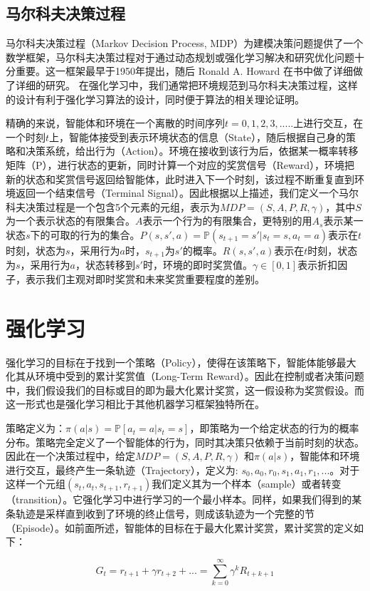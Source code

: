 \documentclass{standalone}
\begin{document}
\subsection{马尔科夫决策过程}
马尔科夫决策过程（Markov Decision Process, MDP）为建模决策问题提供了一个数学框架，马尔科夫决策过程对于通过动态规划或强化学习解决和研究优化问题十分重要。这一框架最早于1950年提出，随后 Ronald A. Howard 在书中做了详细做了详细的研究。
在强化学习中，我们通常把环境规范到马尔科夫决策过程，这样的设计有利于强化学习算法的设计，同时便于算法的相关理论证明。\par
精确的来说，智能体和环境在一个离散的时间序列$t=0,1,2,3,... ..$上进行交互，在一个时刻$t$上，智能体接受到表示环境状态的信息（State），随后根据自己身的策略和决策系统，给出行为（Action）。环境在接收到该行为后，依据某一概率转移矩阵（P），进行状态的更新，同时计算一个对应的奖赏信号（Reward），环境把新的状态和奖赏信号返回给智能体，此时进入下一个时刻，该过程不断重复直到环境返回一个结束信号（Terminal Signal）。因此根据以上描述，我们定义一个马尔科夫决策过程是一个包含5个元素的元组，表示为$MDP=(S, A, P, R, \gamma)$，其中$S$为一个表示状态的有限集合。$A$表示一个行为的有限集合，更特别的用$A_s$表示某一状态$s$下的可取的行为的集合。$P(s, s',a) = \mathbb{P}(s_{t+1} = s'|s_t = s, a_t=a)$表示在$t$时刻，状态为$s$，采用行为$a$时，$s_{t+1}$为$s'$的概率。$R(s, s', a)$表示在$t$时刻，状态为$s$，采用行为$a$，状态转移到$s'$时，环境的即时奖赏值。$\gamma \in [0, 1]$表示折扣因子，表示我们主观对即时奖赏和未来奖赏重要程度的差别。\par 

\section{强化学习}
强化学习的目标在于找到一个策略（Policy），使得在该策略下，智能体能够最大化其从环境中受到的累计奖赏值（Long-Term Reward）。因此在控制或者决策问题中，我们假设我们的目标或目的即为最大化累计奖赏，这一假设称为奖赏假设。而这一形式也是强化学习相比于其他机器学习框架独特所在。\par
策略定义为：$\pi(a|s) = \mathbb{P}[a_t=a | s_t=s]$，即策略为一个给定状态的行为的概率分布。策略完全定义了一个智能体的行为，同时其决策只依赖于当前时刻的状态。
因此在一个决策过程中，给定$MDP=(S, A, P, R, \gamma)$ 和$\pi(a|s)$，智能体和环境进行交互，最终产生一条轨迹（Trajectory），定义为: $s_0, a_0, r_0, s_1, a_1, r_1, ...$。对于这样一个元组$(s_t, a_t, s_{t+1}, r_{t+1})$我们定义其为一个样本（sample）或者转变（transition）。它强化学习中进行学习的一个最小样本。同样，如果我们得到的某条轨迹是采样直到收到了环境的终止信号，则成该轨迹为一个完整的节（Episode）。如前面所述，智能体的目标在于最大化累计奖赏，累计奖赏的定义如下：
\begin{center}
    \begin{equation}
        G_t=r_{t+1} + \gamma r_{t+2}+... = \sum_{k=0}^{\infty}\gamma^{k}R_{t+k+1}
    \end{equation}
\end{center}
\end{document}
